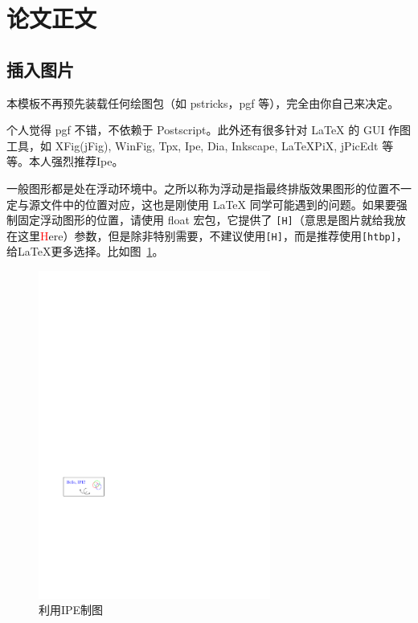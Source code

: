 \section{论文正文}
\subsection{插入图片}
本模板不再预先装载任何绘图包（如 \textsf{pstricks，pgf} 等），完全由你自己来决定。

个人觉得 \textsf{pgf} 不错，不依赖于 Postscript。此外还有很多针对 \LaTeX{} 的 GUI 作图工具，如 XFig(jFig), WinFig, Tpx, Ipe, Dia, Inkscape, LaTeXPiX, jPicEdt 等等。本人强烈推荐\textsf{Ipe}。

一般图形都是处在浮动环境中。之所以称为浮动是指最终排版效果图形的位置不一定与源文件中的位置对应，这也是刚使用 \LaTeX{} 同学可能遇到的问题。如果要强制固定浮动图形的位置，请使用 \textsf{float} 宏包，它提供了 \texttt{[H]}（意思是图片就给我放在这里\textcolor{red}{H}ere）参数，但是除非特别需要，不建议使用\texttt{[H]}，而是推荐使用\texttt{[htbp]}，给\LaTeX{}更多选择。比如图~\ref{fig:ipe}。

\begin{figure}[htbp]
    \centering
    \includegraphics[width=3in]{image/hello.pdf}
    \caption{利用IPE制图}
    \label{fig:ipe}
\end{figure}

